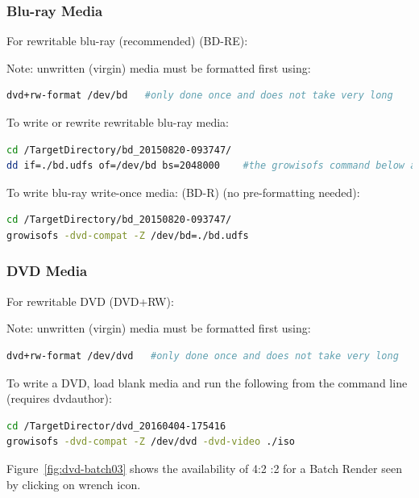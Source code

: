 \subsubsection*{Blu-ray Media}
\label{ssub:bluray_media}

For rewritable blu-ray (recommended) (BD-RE):

Note: unwritten (virgin) media must be formatted first using:

\begin{lstlisting}[language=bash]
dvd+rw-format /dev/bd   #only done once and does not take very long
\end{lstlisting}

To write or rewrite rewritable blu-ray media:

\begin{lstlisting}[language=bash]
cd /TargetDirectory/bd_20150820-093747/
dd if=./bd.udfs of=/dev/bd bs=2048000    #the growisofs command below also works
\end{lstlisting}

To write blu-ray write-once media: (BD-R)  (no pre-formatting needed):

\begin{lstlisting}[language=bash]
cd /TargetDirectory/bd_20150820-093747/
growisofs -dvd-compat -Z /dev/bd=./bd.udfs
\end{lstlisting}

\subsubsection*{DVD Media}
\label{ssub:dvd_media}

For rewritable DVD (DVD+RW):

Note: unwritten (virgin) media must be formatted first using:

\begin{lstlisting}[language=bash]
dvd+rw-format /dev/dvd   #only done once and does not take very long
\end{lstlisting}

To write a DVD, load blank media and run the following from the command line (requires dvdauthor):

\begin{lstlisting}[language=bash]
cd /TargetDirector/dvd_20160404-175416
growisofs -dvd-compat -Z /dev/dvd -dvd-video ./iso
\end{lstlisting}

Figure~\ref{fig:dvd-batch03} shows the availability of 4:2 :2 for a Batch Render seen by clicking on wrench icon.

